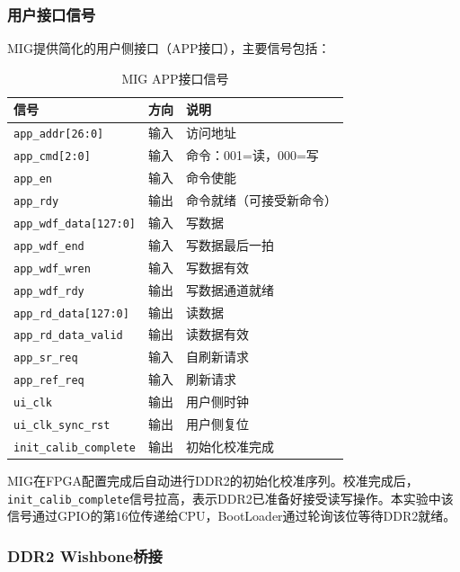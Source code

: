 \subsubsection{用户接口信号}

MIG提供简化的用户侧接口（APP接口），主要信号包括：

\begin{table}[H]
    \centering
    \caption{MIG APP接口信号}
    \begin{tabular}{lll}
        \toprule
        \textbf{信号} & \textbf{方向} & \textbf{说明} \\
        \midrule
        \texttt{app\_addr[26:0]} & 输入 & 访问地址 \\
        \texttt{app\_cmd[2:0]} & 输入 & 命令：001=读，000=写 \\
        \texttt{app\_en} & 输入 & 命令使能 \\
        \texttt{app\_rdy} & 输出 & 命令就绪（可接受新命令） \\
        \texttt{app\_wdf\_data[127:0]} & 输入 & 写数据 \\
        \texttt{app\_wdf\_end} & 输入 & 写数据最后一拍 \\
        \texttt{app\_wdf\_wren} & 输入 & 写数据有效 \\
        \texttt{app\_wdf\_rdy} & 输出 & 写数据通道就绪 \\
        \texttt{app\_rd\_data[127:0]} & 输出 & 读数据 \\
        \texttt{app\_rd\_data\_valid} & 输出 & 读数据有效 \\
        \texttt{app\_sr\_req} & 输入 & 自刷新请求 \\
        \texttt{app\_ref\_req} & 输入 & 刷新请求 \\
        \texttt{ui\_clk} & 输出 & 用户侧时钟 \\
        \texttt{ui\_clk\_sync\_rst} & 输出 & 用户侧复位 \\
        \texttt{init\_calib\_complete} & 输出 & 初始化校准完成 \\
        \bottomrule
    \end{tabular}
\end{table}

MIG在FPGA配置完成后自动进行DDR2的初始化校准序列。校准完成后，\texttt{init\_calib\_complete}信号拉高，表示DDR2已准备好接受读写操作。本实验中该信号通过GPIO的第16位传递给CPU，BootLoader通过轮询该位等待DDR2就绪。

\subsubsection{DDR2 Wishbone桥接}

